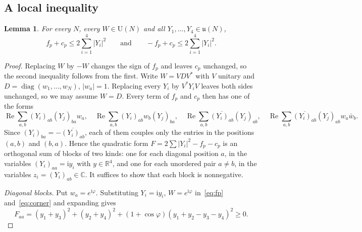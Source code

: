 \documentclass[11pt]{amsart}
\newtheorem{lemma}[theorem]{Lemma}
\theoremstyle{definition}
\theoremstyle{remark}
\newcommand{\R}{\mathbb{R}}
\newcommand{\C}{\mathbb{C}}
\newcommand{\U}{\mathrm{U}}
\begin{document}
\subsection{A local inequality}

\begin{lemma}\label{lem:local}
For every $N$, every $W\in\U(N)$ and all $Y_1,\dots,Y_4\in\mathfrak u(N)$,
\[
f_p+c_p\le 2\sum_{i=1}^4|Y_i|^2\qquad\text{and}\qquad
-f_p+c_p\le 2\sum_{i=1}^4|Y_i|^2 .
\]
\end{lemma}

\begin{proof}
Replacing $W$ by $-W$ changes the sign of $f_p$ and leaves $c_p$ unchanged, so
the second inequality follows from the first. Write $W=VDV^*$ with $V$ unitary
and $D=\operatorname{diag}(w_1,\dots,w_N)$, $|w_a|=1$. Replacing every $Y_i$ by
$V^*Y_iV$ leaves both sides unchanged, so we may assume $W=D$. Every term of
$f_p$ and $c_p$ then has one of the forms
\[
\operatorname{Re}\sum_{a,b}(Y_i)_{ab}(Y_j)_{ba}w_a,\quad
\operatorname{Re}\sum_{a,b}(Y_i)_{ab}w_b(Y_j)_{ba},\quad
\operatorname{Re}\sum_{a,b}\overline{(Y_i)_{ab}}(Y_j)_{ab},\quad
\operatorname{Re}\sum_{a,b}\overline{(Y_i)_{ab}}(Y_j)_{ab}w_a\bar w_b .
\]
Since $(Y_i)_{ba}=-\overline{(Y_i)_{ab}}$, each of them couples only the entries
in the positions $(a,b)$ and $(b,a)$. Hence the quadratic form
$F=2\sum|Y_i|^2-f_p-c_p$ is an orthogonal sum of blocks of two kinds: one for
each diagonal position $a$, in the variables $(Y_i)_{aa}=\mathrm iy_i$ with
$y\in\R^4$, and one for each unordered pair $a\ne b$, in the variables
$z_i=(Y_i)_{ab}\in\C$. It suffices to show that each block is nonnegative.

\emph{Diagonal blocks.} Put $w_a=e^{\mathrm i\varphi}$. Substituting
$Y_i=\mathrm iy_i$, $W=e^{\mathrm i\varphi}$ in~\eqref{eq:fp}
and~\eqref{eq:corner} and expanding gives
\[
F_{aa}=(y_1+y_3)^2+(y_2+y_4)^2+(1+\cos\varphi)(y_1+y_2-y_3-y_4)^2\ge0 .
\]


\end{proof}
\end{document}
